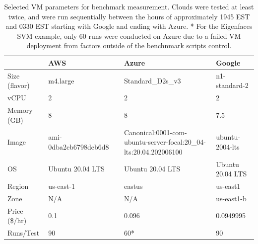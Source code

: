 \begin{table}
  
\caption{Selected VM parameters for benchmark measurement.
Clouds were tested at least twice, and were run sequentially between the
hours of approximately 1945 EST and 0330 EST starting with Google and
ending with Azure. * For the Eigenfaces SVM example, only 60 runs were
conducted on Azure due to a failed VM deployment from factors outside of
the benchnmark scripts control.}
\label{tab:1}

\begin{tabular}[]{@{}llll@{}}
\toprule
\begin{minipage}[b]{0.13\columnwidth}\raggedright
\strut
\end{minipage} & \begin{minipage}[b]{0.17\columnwidth}\raggedright
AWS\strut
\end{minipage} & \begin{minipage}[b]{0.47\columnwidth}\raggedright
Azure\strut
\end{minipage} & \begin{minipage}[b]{0.12\columnwidth}\raggedright
Google\strut
\end{minipage}\tabularnewline
\midrule
Size (flavor)
& 
m4.large~~~~~~~~~~~~
& 
Standard\_D2s\_v3 & 
n1-standard-2
\tabularnewline
vCPU & 2 & 2 & 2
\tabularnewline
Memory (GB) & 8 & 8 & 7.5
\end{minipage}\tabularnewline
Image & ami-0dba2cb6798deb6d8
& \begin{minipage}[t]{0.80\columnwidth}\raggedright
Canonical:0001-com-ubuntu-server-focal:20\_04-lts:20.04.202006100\strut
\end{minipage} & 
ubuntu-2004-lts
\tabularnewline
OS & Ubuntu 20.04 LTS & Ubuntu 20.04 LTS & Ubuntu 20.04 LTS
\end{minipage}\tabularnewline
Region & us-east-1 & eastus & us-east1
\tabularnewline
Zone &  N/A &  N/A & us-east1-b
\tabularnewline
Price (\$/hr)
&  0.1 & 0.096 & 0.0949995
\tabularnewline
Runs/Test
& \begin{minipage}[t]{0.17\columnwidth}\raggedright
90\strut
\end{minipage} & \begin{minipage}[t]{0.47\columnwidth}\raggedright
60*\strut
\end{minipage} & \begin{minipage}[t]{0.12\columnwidth}\raggedright
90\strut
\end{minipage}\tabularnewline
\bottomrule
\end{tabular}
\end{table}

